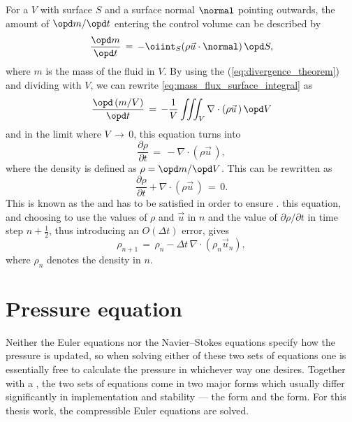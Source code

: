 For a  $V$ with surface $S$ and a surface normal $\normal$ pointing outwards, the amount of  $\opd m/\opd t$ entering the control volume can be described by
%
\begin{equation} \label{eq:mass_flux_surface_integral}
\frac{\opd m}{\opd t} \,=\, -\oiint_S(\rho\vec{u}\cdot\normal)\,\opd S,
\end{equation}
%
where $m$ is the mass of the fluid in $V$. By using the  (\eqref{eq:divergence_theorem}) and dividing with $V$, we can rewrite \eqref{eq:mass_flux_surface_integral} as
%
\begin{equation} \label{eq:mass_flux_volume_integral}
\frac{\opd\,(m/V)}{\opd t} \,=\, -\frac{1}{V}\iiint_V\nabla\cdot(\rho\vec{u}\,)\,\opd V
\end{equation}
%
and in the limit where $V \,\rightarrow\, 0$, this equation turns into
%
\begin{equation} \label{eq:density_partial_time_derivative}
\frac{\partial \rho}{\partial t} \,=\, -\nabla\cdot(\rho\vec{u}\,),
\end{equation}
%
where the density is defined as $\rho = \opd m/\opd V$. This can be rewritten as
%
\begin{equation} \label{eq:continuity_equation}
\frac{\partial \rho}{\partial t} + \nabla\cdot(\rho\vec{u}\,) \,=\, 0.
\end{equation}
%
This is known as the  and has to be satisfied in order to ensure .  this equation, and choosing to use the values of $\rho$ and $\vec{u}$ in \timestep $n$ and the value of $\partial \rho/\partial t$ in time step $n+\frac{1}{2}$, thus introducing an $O(\Delta t)$ error, gives
%
\begin{equation} \label{eq:continuity_equation_time_discretized}
\rho_{n+1} \,=\, \rho_{n} - \Delta t\,\nabla\cdot(\rho_{n}\vec{u}_{n}),
\end{equation}
%
where $\rho_n$ denotes the density in \timestep $n$.

\section{Pressure equation}
\label{sec:pressure_calculation}

Neither the Euler equations nor the Navier--Stokes equations specify how the pressure is updated, so when solving either of these two sets of equations one is essentially free to calculate the pressure in whichever way one desires. Together with a , the two sets of equations come in two major forms which usually differ significantly in implementation and stability --- the \compressible form and the \incompressible form. For this thesis work, the compressible Euler equations are solved.

